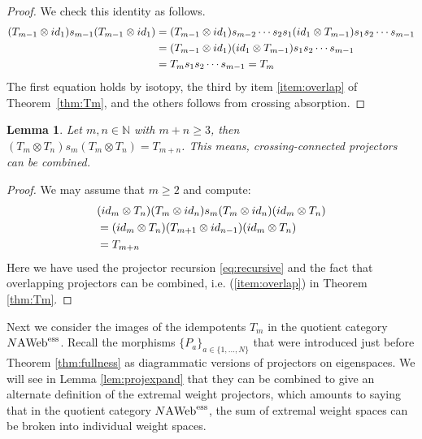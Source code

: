 \documentclass[11pt]{article}
\newtheorem{lemma}[theo]{Lemma}
\theoremstyle{definition}
\numberwithin{equation}{section}
\def\N{{\mathbb N}}
\newcommand{\id}{{\rm id}}
\newcommand{\cat}[1]{\ensuremath{\mbox{\bfseries {\upshape {#1}}}}}
\newcommand{\AWeb}[1][]{#1\cat{A}\cat{Web}}
\newcommand{\essAWeb}[1][]{#1\AWeb^{\mathrm{ess}}}
\begin{document}
\begin{proof} We check this identity as follows.
\begin{align*}
(T_{m-1}\otimes \id_1)s_{m-1}(T_{m-1}\otimes \id_1) &= (T_{m-1}\otimes \id_1)s_{m-2}\cdots s_{2}s_{1}(\id_1\otimes T_{m-1}) s_1 s_2 \cdots s_{m-1}\\ 
                                                    &= (T_{m-1}\otimes \id_1)(\id_1\otimes T_{m-1} ) s_1 s_2 \cdots s_{m-1}\\
  &= T_m s_1 s_2 \cdots s_{m-1} =T_m
\end{align*}
The first equation holds by isotopy, the third by item \eqref{item:overlap} of Theorem~\ref{thm:Tm}, and the others follows from crossing absorption.
\end{proof}


\begin{lemma}\label{lem:linkedproj} Let $m,n\in \N$ with $m+n\geq 3$, then $(T_m\otimes T_n)s_m(T_m\otimes T_n)=T_{m+n}$. This means, crossing-connected projectors can be combined. 
\end{lemma}
\begin{proof} We may assume that $m\geq 2$ and compute:
  \begin{align*}
    &(\id_m\otimes T_n)(T_m\otimes \id_n)s_m(T_m\otimes \id_n)(\id_m\otimes T_n) \\
    & = (\id_m\otimes T_n)(T_{m+1}\otimes \id_{n-1})(\id_m\otimes T_n) \\
                                                                               & = T_{m+n}
  \end{align*}
  Here we have used the projector recursion \eqref{eq:recursive} and the fact that overlapping projectors can be combined, i.e. (\ref{item:overlap}) in Theorem \ref{thm:Tm}.
\end{proof}

Next we consider the images of the idempotents $T_m$ in the quotient category
$\essAWeb[N]$. Recall the morphisms $\{P_a\}_{a\in \{1,\dots, N\}}$ that were
introduced just before Theorem \ref{thm:fullness} as diagrammatic versions of
projectors on eigenspaces. We will see in Lemma \ref{lem:projexpand} that they
can be combined to give an alternate definition of the extremal weight
projectors, which amounts to saying that in the quotient category $\essAWeb[N]$,
the sum of extremal weight spaces can be broken into individual weight spaces.
\end{document}
